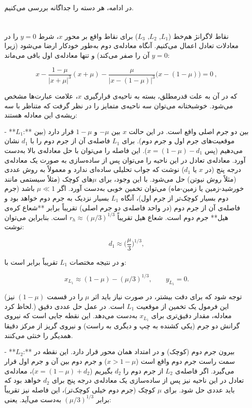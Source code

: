 در ادامه، هر دسته را جداگانه بررسی می‌کنیم.

\section{} نقاط لاگرانژ هم‌خط ($L_1$, $L_2$, $L_3$)  
برای نقاط واقع بر محور $x$، شرط $y=0$ را در معادلات تعادل اعمال می‌کنیم. آنگاه معادله‌ی دوم به‌طور خودکار ارضا می‌شود (زیرا $y=0$ آن را صفر می‌کند) و تنها معادله‌ی اول باقی می‌ماند:

$$ 
x - \frac{1-\mu}{|x+\mu|^3}(x+\mu) - \frac{\mu}{|x-(1-\mu)|^3}\Big(x-(1-\mu)\Big) = 0~,
$$

که در آن به علت قدرمطلق، بسته به ناحیه‌ی قرارگیری $x$، علامت عبارت‌ها مشخص می‌شود. خوشبختانه می‌توان سه ناحیه‌ی متمایز را در نظر گرفت که متناظر با سه ریشه‌ی این معادله هستند:  

- **$L_1$:** بین دو جرم اصلی واقع است. در این حالت $x$ بین $-\mu$ و $1-\mu$ قرار دارد (بین موقعیت‌های جرم اول و جرم دوم). برای $L_1$ فاصله‌ی آن از جرم دوم را با $d_1$ نشان می‌دهیم (پس $x = (1-\mu) - d_1$). این فاصله را می‌توان با حل معادله‌ی بالا به‌دست آورد. معادله‌ی تعادل در این ناحیه را می‌توان پس از ساده‌سازی به صورت یک معادله‌ی درجه پنج (در $x$ یا $d_1$) نوشت که جواب تحلیلی ساده‌ای ندارد و معمولاً به روش عددی (مثلاً روش نیوتن) حل می‌شود. با این وجود، برای $\mu$های کوچک (مثلاً سیستمی مانند خورشید-زمین یا زمین-ماه) می‌توان تخمین خوبی به‌دست آورد. اگر $\mu \ll 1$ باشد (جرم دوم بسیار کوچک‌تر از جرم اول)، آنگاه $L_1$ بسیار نزدیک به جرم دوم خواهد بود و فاصله‌ی آن از جرم دوم (در واحد فاصله‌ی دو جرم اصلی) تقریباً برابر **شعاع کره‌ی هیل** جرم دوم است. شعاع هیل تقریباً $r_h \approx (\mu/3)^{1/3}$ است. بنابراین می‌توان نوشت: 

$$d_1 \approx \Big(\frac{\mu}{3}\Big)^{1/3},$$ 

و در نتیجه مختصات $L_1$ تقریباً برابر است با: 

$$x_{L_1} \approx (1-\mu) - (\mu/3)^{1/3}, \qquad y_{L_1}=0.$$ 

(توجه شود که برای دقت بیشتر، در صورت نیاز باید اثر $\mu$ را در قسمت $(1-\mu)$ نیز لحاظ کرد.) این فرمول یک تخمین از موقعیت $L_1$ است. در عمل حل عددی دقیق معادله، مقدار دقیق‌تری برای $x_{L_1}$ به‌دست می‌دهد. این نقطه جایی است که نیروی گرانش دو جرم (یکی کشنده به چپ و دیگری به راست) و نیروی گریز از مرکز دقیقا همدیگر را خنثی می‌کنند. 

- **$L_2$:** بیرون جرم دوم (کوچک) و در امتداد همان محور قرار دارد. این نقطه در سمت راست جرم دوم واقع است ($x > 1-\mu$) و جرم دوم بین آن و جرم اول قرار می‌گیرد. اگر فاصله‌ی $L_2$ از جرم دوم را $d_2$ بگیریم ($x = (1-\mu) + d_2$)، معادله‌ی تعادل در این ناحیه نیز پس از ساده‌سازی یک معادله‌ی درجه پنج برای $d_2$ خواهد بود که باید عددی حل شود. برای $\mu$ کوچک (جرم دوم خیلی کوچک‌تر)، این فاصله نیز تقریباً برابر $(\mu/3)^{1/3}$ به‌دست می‌آید. یعنی: 

